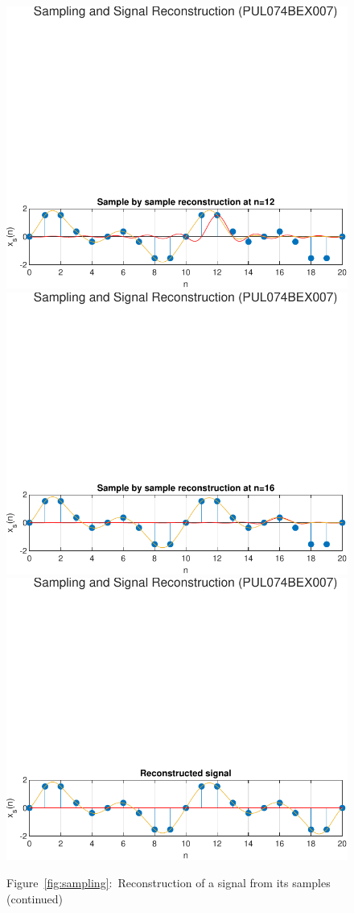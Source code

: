 \documentclass{lab_sheet}
\begin{document}
\begin{figure}[H]
    \includegraphics[width=0.8\linewidth]{../Figures/s_5}
    \includegraphics[width=0.8\linewidth]{../Figures/s_6}
    \includegraphics[width=0.8\linewidth]{../Figures/s_7}
    \caption*{Figure~\ref{fig:sampling}:~Reconstruction of a signal from its samples (continued)}
\end{figure}
\end{document}
